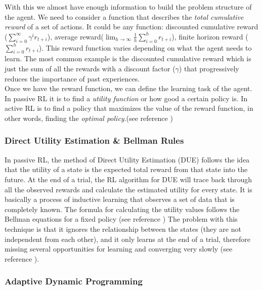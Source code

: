 With this we almost have enough information to build the problem structure of the agent. We need to consider a function that describes the  \emph{total cumulative reward} of a set of actions. It could be any function: discounted cumulative reward ($\sum^{\infty}_{i=0}\gamma^ir_{t+i}$), average reward($\lim_{h\to\infty}\frac{1}{h}\sum^{h}_{i=0}r_{t+i}$), finite horizon reward ($\sum^{h}_{i=0}r_{t+i}$). This reward function varies depending on what the agent needs to learn. The most common example is the discounted cumulative reward which is just the sum of all the rewards with a discount factor ($\gamma$) that progressively reduces the importance of past experiences. \\


Once we have the reward function, we can define the learning task of the agent. In passive RL it is to find a \emph{utility function} or how good a certain policy is. In active RL is to find a policy that maximizes the value of the reward function, in other words, finding the \emph{optimal policy}.(see reference \cite{ml_tom_mitchel})\\



\subsubsection{Direct Utility Estimation \& Bellman Rules}

In passive RL, the method of Direct Utility Estimation (DUE) follows the idea that the utility of a state is the expected total reward from that state into the future. At the end of a trial, the RL algorithm for DUE will trace back through all the observed rewards and calculate the estimated utility for every state. It is basically a process of inductive learning that observes a set of data that is completely known. The formula for calculating the utility values follows the Bellman equations for a fixed policy  (see reference \cite{rl})
The problem with this technique is that it ignores the relationship between the states (they are not independent from each other), and it only learns at the end of a trial, therefore missing several opportunities for learning and converging very slowly (see reference \cite{rl}).

\subsubsection{Adaptive Dynamic Programming}

